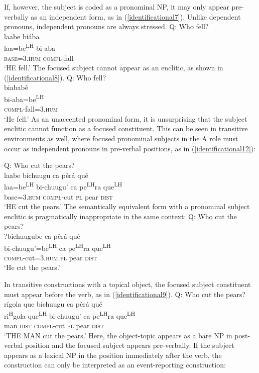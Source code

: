 If, however, the subject is coded as a pronominal NP, it may only appear pre-verbally as an independent form, as in (\ref{identificational7}). Unlike dependent pronouns, independent pronouns are always stressed.
\ea\label{identificational7}  
{Q: Who fell?} \\
\glll laabe bi\'{a}ba   \\
laa=be\textsuperscript{LH} bi-aba  \\
\textsc{base}=\textsc{3.hum} \textsc{compl}-fall  \\
\glt `HE fell.'
\z
The focused subject cannot appear as an enclitic, as shown in (\ref{identificational8}). 
\ea\label{identificational8}  
{Q: Who fell?} \\
\glll {\#}biabab\v{e}  \\
bi-aba=be\textsuperscript{LH}\\
\textsc{compl}-fall=\textsc{3.hum}  \\
\glt `He fell.'  
\z
As an unaccented pronominal form, it is unsurprising that the subject enclitic cannot function as a focused constituent. This can be seen in transitive environments as well, where focused pronominal subjects in the A role must occur as independent pronouns in pre-verbal positions, as in (\ref{identificational12}):

\ea\label{identificational12} 
{Q: Who cut the pears?} \\
\glll laabe b\'{i}chuugu ca p\v{e}r\'{a} qu\v{e}  \\
laa=be\textsuperscript{LH} bi-chuugu' ca pe\textsuperscript{LH}ra que\textsuperscript{LH}  \\
base=\textsc{3.hum} \textsc{compl}-cut \textsc{pl} pear \textsc{dist}  \\
\glt `HE cut the pears.'
\z
The semantically equivalent form with a pronominal subject enclitic is pragmatically inappropriate in the same context: 
\ea\label{identificational13}  
{Q: Who cut the pears?} \\
\glll ?bichuugube ca p\v{e}r\'{a} qu\v{e}  \\
bi-chuugu'=be\textsuperscript{LH} ca pe\textsuperscript{LH}ra que\textsuperscript{LH}  \\
\textsc{compl}-cut=\textsc{3.hum} \textsc{pl} pear \textsc{dist}  \\
\glt `He cut the pears.'
\z

In transitive constructions with a topical object, the focused subject constituent must appear before the verb, as in (\ref{identificational9}). 
\ea\label{identificational9}  
{Q: Who cut the pears?} \\
\glll r\'{i}gola que b\'{i}chuugu ca p\v{e}r\'{a} qu\v{e}  \\
ri\textsuperscript{H}gola que\textsuperscript{LH} bi-chuugu' ca pe\textsuperscript{LH}ra que\textsuperscript{LH}  \\
man \textsc{dist} \textsc{compl}-cut \textsc{pl} pear \textsc{dist}  \\
\glt `THE MAN cut the pears.'
\z
Here, the object-topic appears as a bare NP in post-verbal position and the focused subject appears pre-verbally. If the subject appears as a lexical NP in the position immediately after the verb, the construction can only be interpreted as an event-reporting construction:

